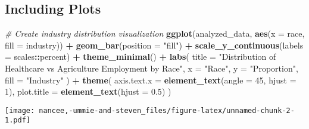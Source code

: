 \documentclass[
]{article}
\newenvironment{Shaded}{\begin{snugshade}}{\end{snugshade}}
\newcommand{\AttributeTok}[1]{\textcolor[rgb]{0.13,0.29,0.53}{#1}}
\newcommand{\CommentTok}[1]{\textcolor[rgb]{0.56,0.35,0.01}{\textit{#1}}}
\newcommand{\DecValTok}[1]{\textcolor[rgb]{0.00,0.00,0.81}{#1}}
\newcommand{\FloatTok}[1]{\textcolor[rgb]{0.00,0.00,0.81}{#1}}
\newcommand{\FunctionTok}[1]{\textcolor[rgb]{0.13,0.29,0.53}{\textbf{#1}}}
\newcommand{\NormalTok}[1]{#1}
\newcommand{\SpecialCharTok}[1]{\textcolor[rgb]{0.81,0.36,0.00}{\textbf{#1}}}
\newcommand{\StringTok}[1]{\textcolor[rgb]{0.31,0.60,0.02}{#1}}
\begin{document}
\subsection{Including Plots}\label{including-plots}

\begin{Shaded}
\begin{Highlighting}[]
\CommentTok{\# Create industry distribution visualization}
\FunctionTok{ggplot}\NormalTok{(analyzed\_data, }\FunctionTok{aes}\NormalTok{(}\AttributeTok{x =}\NormalTok{ race, }\AttributeTok{fill =}\NormalTok{ industry)) }\SpecialCharTok{+}
  \FunctionTok{geom\_bar}\NormalTok{(}\AttributeTok{position =} \StringTok{"fill"}\NormalTok{) }\SpecialCharTok{+}
  \FunctionTok{scale\_y\_continuous}\NormalTok{(}\AttributeTok{labels =}\NormalTok{ scales}\SpecialCharTok{::}\NormalTok{percent) }\SpecialCharTok{+}
  \FunctionTok{theme\_minimal}\NormalTok{() }\SpecialCharTok{+}
  \FunctionTok{labs}\NormalTok{(}
    \AttributeTok{title =} \StringTok{"Distribution of Healthcare vs Agriculture Employment by Race"}\NormalTok{,}
    \AttributeTok{x =} \StringTok{"Race"}\NormalTok{,}
    \AttributeTok{y =} \StringTok{"Proportion"}\NormalTok{,}
    \AttributeTok{fill =} \StringTok{"Industry"}
\NormalTok{  ) }\SpecialCharTok{+}
  \FunctionTok{theme}\NormalTok{(}
    \AttributeTok{axis.text.x =} \FunctionTok{element\_text}\NormalTok{(}\AttributeTok{angle =} \DecValTok{45}\NormalTok{, }\AttributeTok{hjust =} \DecValTok{1}\NormalTok{),}
    \AttributeTok{plot.title =} \FunctionTok{element\_text}\NormalTok{(}\AttributeTok{hjust =} \FloatTok{0.5}\NormalTok{)}
\NormalTok{  )}
\end{Highlighting}
\end{Shaded}

\texttt{[image: nancee,-ummie-and-steven\_files/figure-latex/unnamed-chunk-2-1.pdf]}
\end{document}
